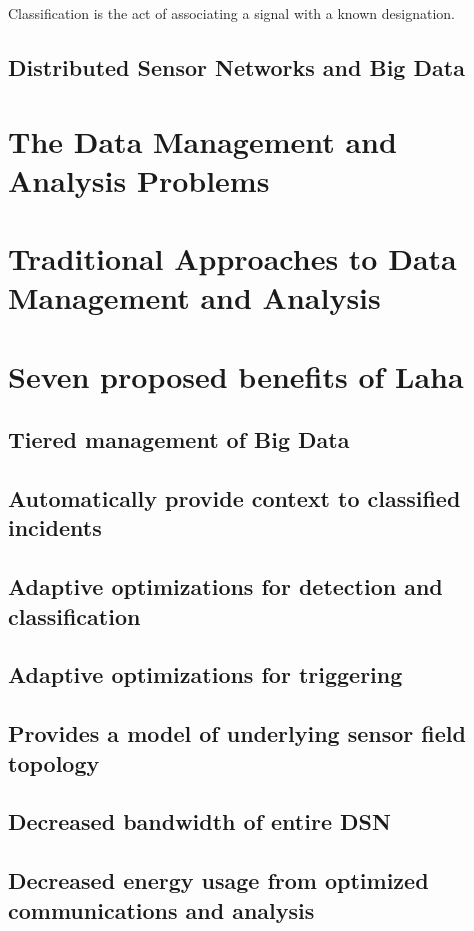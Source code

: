 Classification is the act of associating a signal with a known designation. 

\subsection{Distributed Sensor Networks and Big Data}

\section{The Data Management and Analysis Problems}

\section{Traditional Approaches to Data Management and Analysis}

\section{Seven proposed benefits of Laha} \label{laha-benefits}
\subsection{Tiered management of Big Data}
\subsection{Automatically provide context to classified incidents}
\subsection{Adaptive optimizations for detection and classification}
\subsection{Adaptive optimizations for triggering}
\subsection{Provides a model of underlying sensor field topology}
\subsection{Decreased bandwidth of entire DSN}
\subsection{Decreased energy usage from optimized communications and analysis}

